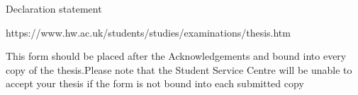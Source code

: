 Declaration statement

https://www.hw.ac.uk/students/studies/examinations/thesis.htm

This form should be placed after the Acknowledgements and bound into every copy of the thesis.Please note that the Student Service Centre will be unable to accept your thesis if the form is not bound into each submitted copy